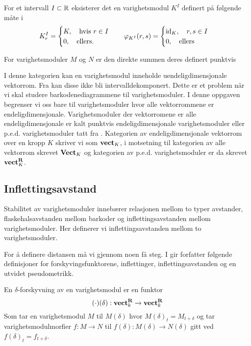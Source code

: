 \begin{eksempel}\label{eks:IntMod}
For et intervall $I\subset\mathbb{R}$ eksisterer det en varighetsmodul $K^I$ definert på følgende måte i \cite{Bauer2020}
\[
K^I_r =
\begin{cases}
K, \quad\text{hvis } r\in I\\
0, \quad\text{ellers.}
\end{cases}\quad 
\varphi_{K^I}(r,s) = 
\begin{cases}
\textnormal{id}_K,\quad r,s\in I\\
0,\quad \text{ellers}
\end{cases}
\]
\end{eksempel}

\begin{definisjon}\label{prop:VMDS}
  For varighetsmoduler $M$ og $N$ er den direkte summen
  deres definert punktvis
\end{definisjon}



I denne kategorien kan en varighetsmodul inneholde
uendeligdimensjonale vektorrom. Fra \citep[teorem
2.8]{Chazal2016} kan disse ikke bli
intervalldekomponert. Dette er et problem når vi skal
studere barkodenediagrammene til varighetsmoduler.
I denne oppgaven begrenser vi oss bare til
varighetsmoduler hvor alle vektorrommene er
endeligdimensjonale. Varighetsmoduler der vektorromene er alle
endeligdimensjonale er kalt punktvis endeligdimensjonale
varighetsmoduler eller p.e.d. varighetsmoduler tatt fra
\cite{Bauer2015}. Kategorien av endeligdimensjonale
vektorrom over en kropp $K$ skriver vi som $\textnormal{\textbf{vect}}_K$,
i motsetning til kategorien av alle vektorrom skrevet
$\textnormal{\textbf{Vect}}_K$ og kategorien av p.e.d. varighetsmoduler er da skrevet
$\textnormal{\textbf{vect}}_K^{\textnormal{\textbf{{R}}}}$.

\subsection{Inflettingsavstand}
Stabilitet av varighetsmoduler innebærer relasjonen mellom
to typer avstander, flaskehalsavstanden mellom barkoder
og inflettingsavstanden mellom varighetsmoduler. Her
definerer vi inflettingsavstanden mellom to
varighetsmoduler.

For å definere distansen må vi gjennom noen få steg.
I \citep[seksjon 3.1]{Bauer2015} gir forfatter følgende
definisjoner for forskyvingsfunktorene, inflettinger,
inflettingsavstanden og en utvidet pseudometrikk.
\begin{definisjon}\label{Def:DShift}
	En $\delta$-forskyvning av en varighetsmodul er en funktor
	\[(\cdot)(\delta): \textnormal{\textbf{vect}}_k^{\textnormal{\textbf{R}}}\to \textnormal{\textbf{vect}}_k^{\textnormal{\textbf{R}}}\]
	Som tar en varighetsmodul $M$ til $M(\delta)$ hvor
  $M(\delta)_t = M_{t+\delta}$ og tar
  varighetsmodulmorfier $f:M\to N$ til
  $f(\delta):M(\delta)\to N(\delta)$ gitt ved
  $f(\delta)_t=f_{t+\delta}$.
\end{definisjon}

